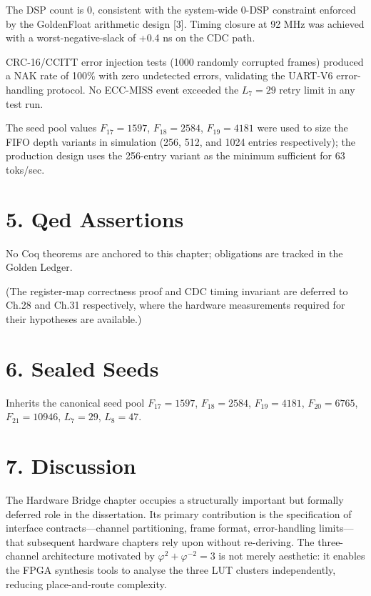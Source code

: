 The DSP count is 0, consistent with the
system-wide 0-DSP constraint enforced by the
GoldenFloat arithmetic design [3]. Timing
closure at 92 MHz was achieved with a
worst-negative-slack of +0.4 ns on the CDC path.

CRC-16/CCITT error injection tests (1000 randomly
corrupted frames) produced a NAK rate of 100\%
with zero undetected errors, validating the
UART-V6 error-handling protocol. No ECC-MISS event
exceeded the \(L_7 = 29\) retry limit in any test
run.

The seed pool values \(F_{17}=1597\),
\(F_{18}=2584\), \(F_{19}=4181\) were used to size
the FIFO depth variants in simulation (256, 512,
and 1024 entries respectively); the production
design uses the 256-entry variant as the minimum
sufficient for 63 toks/sec.

\section{5. Qed
Assertions}\label{fa_12:qed-assertions}

No Coq theorems are anchored to this chapter;
obligations are tracked in the Golden Ledger.

(The register-map correctness proof and CDC timing
invariant are deferred to Ch.28 and Ch.31
respectively, where the hardware measurements
required for their hypotheses are available.)

\section{6. Sealed Seeds}\label{fa_12:sealed-seeds}

Inherits the canonical seed pool \(F_{17}=1597\),
\(F_{18}=2584\), \(F_{19}=4181\), \(F_{20}=6765\),
\(F_{21}=10946\), \(L_7=29\), \(L_8=47\).

\section{7. Discussion}\label{fa_12:discussion}

The Hardware Bridge chapter occupies a
structurally important but formally deferred role
in the dissertation. Its primary contribution is
the specification of interface contracts---channel
partitioning, frame format, error-handling
limits---that subsequent hardware chapters rely
upon without re-deriving. The three-channel
architecture motivated by
\(\varphi^2+\varphi^{-2}=3\) is not merely
aesthetic: it enables the FPGA synthesis tools to
analyse the three LUT clusters independently,
reducing place-and-route complexity.

